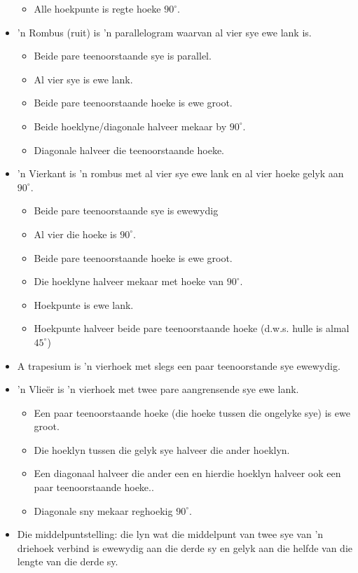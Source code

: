 \begin{itemize}[noitemsep]
\begin{itemize}
\item Alle hoekpunte is regte hoeke $90^{\circ}$.
\end{itemize}
\item ’n Rombus (ruit) is ’n parallelogram waarvan al vier sye ewe lank is.
\begin{itemize}
\item Beide pare teenoorstaande sye is parallel.
\item Al vier sye is ewe lank.
\item Beide pare teenoorstaande hoeke is ewe groot.
\item Beide hoeklyne/diagonale halveer mekaar by $90^\circ$.
\item Diagonale halveer die teenoorstaande hoeke.
\end{itemize}
\item ’n Vierkant is ’n rombus met al vier sye ewe lank en al vier hoeke gelyk aan $90^\circ$.
\begin{itemize}
\item Beide pare teenoorstaande sye is ewewydig
\item Al vier die hoeke is $90^\circ$.
\item Beide pare teenoorstaande hoeke is ewe groot.
\item Die hoeklyne halveer mekaar met hoeke van $90^\circ$.
\item Hoekpunte is ewe lank.
\item Hoekpunte halveer beide pare teenoorstaande hoeke (d.w.s. hulle is almal $45^\circ$)
\end{itemize}
\item A trapesium is 'n vierhoek met slegs een paar teenoorstande sye ewewydig.
\item ’n Vlieër is ’n vierhoek met twee pare aangrensende sye ewe lank.
\begin{itemize}
\item Een paar teenoorstaande hoeke (die hoeke tussen die ongelyke sye) is ewe groot.
\item Die hoeklyn tussen die gelyk sye halveer die ander hoeklyn.
\item Een diagonaal halveer die ander een en hierdie hoeklyn halveer ook een paar teenoorstaande hoeke..
\item Diagonale sny mekaar reghoekig $90^\circ$.
\end{itemize}
\item Die middelpuntstelling: die lyn wat die middelpunt van twee sye van 'n driehoek verbind is ewewydig aan die derde sy en gelyk aan die helfde van die lengte van die derde sy.
\end{itemize}

